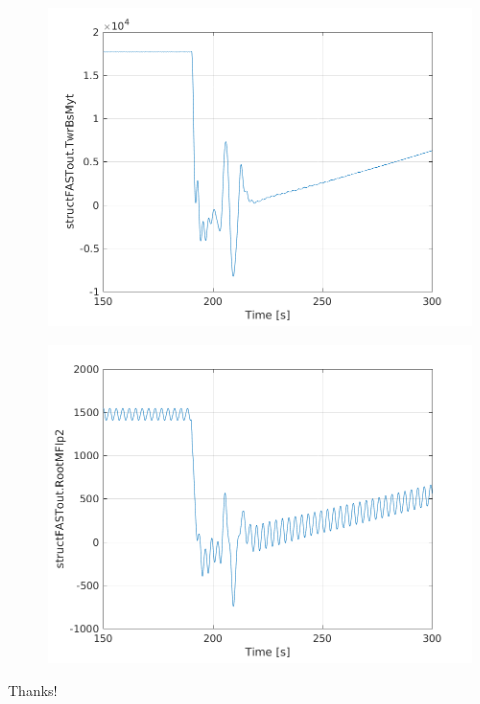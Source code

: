 \documentclass[12pt,t]{beamer}
\begin{document}
\begin{frame}
\begin{figure}[H]
\begin{minipage}{0.38\textwidth}
\end{minipage}
\begin{minipage}{0.38\textwidth}
  \includegraphics[width=1\linewidth]{../CIP_6/FASTextreme/EOG_50_failtime/TwrBsMyt.png} \\
\end{minipage}
\begin{minipage}{0.38\textwidth}
  \includegraphics[width=1\linewidth]{../CIP_6/FASTextreme/EOG_50_failtime/RootMFlp2.png} \\
\end{minipage}
\end{figure}

\end{frame}


\begin{frame}[fragile]
\vspace{100 pt}
\Huge
\begin{center}
Thanks!
\end{center}
\end{frame}
\end{document}
